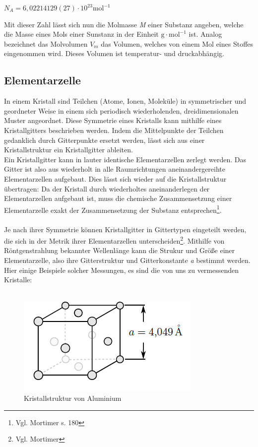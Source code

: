 \documentclass[12pt,a4paper,titlepage,headinclude,bibtotoc]{scrartcl}
\begin{document}
\begin{center}
$N_{A}=6,02214129(27)\cdot 10^{23}\mathrm{mol^{-1}}$ 
\end{center}

Mit dieser Zahl lässt sich nun die Molmasse \textit{M} einer Substanz angeben, welche die Masse eines Mols einer Sunstanz in der Einheit $ \mathrm{g \cdot mol^{-1}}$ ist. Analog bezeichnet das Molvolumen $V_{m}$ das Volumen, welches von einem Mol eines Stoffes eingenommen wird. Dieses Volumen ist temperatur- und druckabhängig.

\subsection{Elementarzelle}
In einem Kristall sind Teilchen (Atome, Ionen, Moleküle) in symmetrischer und geordneter Weise in einem sich periodisch wiederholenden, dreidimensionalen Muster angeordnet. Diese Symmetrie eines Kristalls kann mithilfe eines Kristallgitters beschrieben werden. Indem die Mittelpunkte der Teilchen gedanklich durch Gitterpunkte ersetzt werden, lässt sich aus einer Kristallstruktur ein Kristallgitter ableiten.\\
Ein Kristallgitter kann in lauter identische Elementarzellen zerlegt werden. Das Gitter ist also aus wiederholt in alle Raumrichtungen aneinandergereihte Elementarzellen aufgebaut. Dies lässt sich wieder auf die Kristallstruktur übertragen: Da der Kristall durch wiederholtes aneinanderlegen der Elementarzellen aufgebaut ist, muss die chemische Zusammensetzung einer Elementarzelle exakt der Zusammensetzung der Substanz entsprechen\footnote{Vgl. Mortimer s. 180}.\\\\
Je nach ihrer Symmetrie können Kristallgitter in Gittertypen eingeteilt werden, die sich in der Metrik ihrer Elementarzellen unterscheiden\footnote{Vgl. Mortimer}. Mithilfe von Röntgenstrahlung bekannter Wellenlänge kann die Strukur und Größe einer Elementarzelle, also ihre Gitterstruktur und Gitterkonstante \textit{a} bestimmt werden. Hier einige Beispiele solcher Messungen, es sind die von uns zu vermessenden Kristalle:\\\\


\begin{figure} [h]
\begin{center}
\includegraphics[scale=0.7]{Aluminium.png} \end{center}
\caption{Kristallstruktur von Aluminium}
\end{figure}
\end{document}
